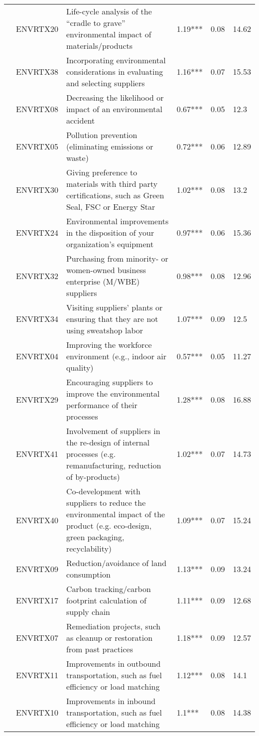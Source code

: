 \begin{landscape}
\begin{longtable}{l@{\hspace{6pt}}l@{\hspace{6pt}}p{11cm}@{\hspace{6pt}}l@{\hspace{6pt}}l@{\hspace{6pt}}l}
 & ENVRTX20 & Life-cycle analysis of the “cradle to grave” environmental impact of materials/products & 1.19*** & 0.08 & 14.62 \\
 & ENVRTX38 & Incorporating environmental considerations in evaluating and selecting suppliers & 1.16*** & 0.07 & 15.53 \\
 & ENVRTX08 & Decreasing the likelihood or impact of an environmental accident & 0.67*** & 0.05 & 12.3 \\
 & ENVRTX05 & Pollution prevention (eliminating emissions or waste) & 0.72*** & 0.06 & 12.89 \\
 & ENVRTX30 & Giving preference to materials with third party certifications, such as Green Seal, FSC or Energy Star & 1.02*** & 0.08 & 13.2 \\
 & ENVRTX24 & Environmental improvements in the disposition of your organization’s equipment & 0.97*** & 0.06 & 15.36 \\
 & ENVRTX32 & Purchasing from minority- or women-owned business enterprise (M/WBE) suppliers & 0.98*** & 0.08 & 12.96 \\
 & ENVRTX34 & Visiting suppliers’ plants or ensuring that they are not using sweatshop labor & 1.07*** & 0.09 & 12.5 \\
 & ENVRTX04 & Improving the workforce environment (e.g., indoor air quality) & 0.57*** & 0.05 & 11.27 \\
 & ENVRTX29 & Encouraging suppliers to improve the environmental performance of their processes & 1.28*** & 0.08 & 16.88 \\
 & ENVRTX41 & Involvement of suppliers in the re-design of internal processes (e.g. remanufacturing, reduction of by-products) & 1.02*** & 0.07 & 14.73 \\
 & ENVRTX40 & Co-development with suppliers to reduce the environmental impact of the product (e.g. eco-design, green packaging, recyclability) & 1.09*** & 0.07 & 15.24 \\
 & ENVRTX09 & Reduction/avoidance of land consumption & 1.13*** & 0.09 & 13.24 \\
 & ENVRTX17 & Carbon tracking/carbon footprint calculation of supply chain & 1.11*** & 0.09 & 12.68 \\
 & ENVRTX07 & Remediation projects, such as cleanup or restoration from past practices & 1.18*** & 0.09 & 12.57 \\
 & ENVRTX11 & Improvements in outbound transportation, such as fuel efficiency or load matching & 1.12*** & 0.08 & 14.1 \\
 & ENVRTX10 & Improvements in inbound transportation, such as fuel efficiency or load matching & 1.1*** & 0.08 & 14.38 \\

\end{longtable}
\end{landscape}
